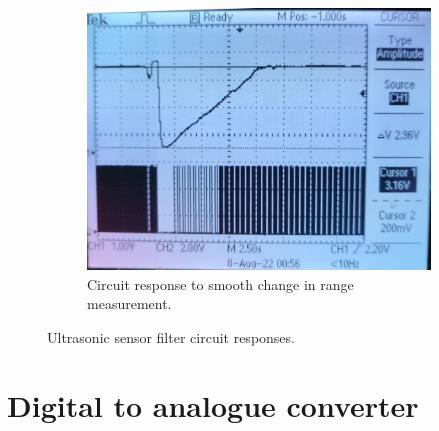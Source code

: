 \begin{figure}[H]
\begin{subfigure}[]{0.45\textwidth}
\includegraphics[width=\linewidth]{./Figures/SonicSens_Prac_Range.jpeg}
\caption{Circuit response to smooth change in range measurement.}
\label{subfig:sonicsen_prac_range}	
\end{subfigure}
\caption{Ultrasonic sensor filter circuit responses.}
\label{fig:sonicsen_prac}
\end{figure}


\clearpage
\section{Digital to analogue converter}
